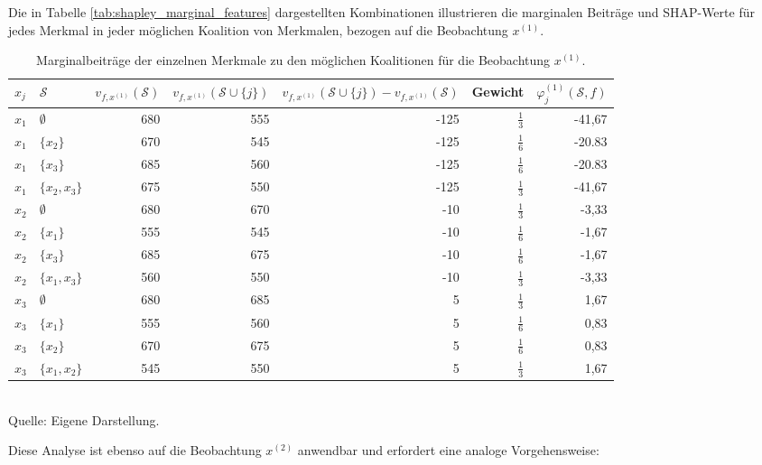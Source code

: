 Die in Tabelle \ref{tab:shapley_marginal_features} dargestellten Kombinationen illustrieren die marginalen Beiträge und SHAP-Werte 
für jedes Merkmal in jeder möglichen Koalition von Merkmalen, bezogen auf die Beobachtung $x^{(1)}$. 

\begin{table}[h]
    \caption{Marginalbeiträge der einzelnen Merkmale zu den möglichen Koalitionen für die Beobachtung $x^{(1)}$.}
    \footnotesize
    \begin{tabularx}{\textwidth}{XXrrrrr}
    \toprule
    $x_{j}$ & $\mathcal{S}$ & $v_{f, x^{(1)}}(\mathcal{S})$ & $v_{f, x^{(1)}}(\mathcal{S} \cup \{j\})$ & $v_{f, x^{(1)}}(\mathcal{S} \cup \{j\}) - v_{f, x^{(1)}}(\mathcal{S})$ & Gewicht & $\varphi_{j}^{(1)}(\mathcal{S}, f)$\\
    \midrule
    $x_1$ & $\emptyset$ & 680 & 555 & -125 & $\frac{1}{3}$ & -41,67 \\
    $x_1$ & $\{x_2\}$ & 670 & 545 & -125 & $\frac{1}{6}$ & -20.83 \\
    $x_1$ & $\{x_3\}$ & 685 & 560 & -125 & $\frac{1}{6}$ & -20.83 \\
    $x_1$ & $\{x_2, x_3\}$ & 675 & 550 & -125 & $\frac{1}{3}$ & -41,67 \\
    $x_2$ & $\emptyset$ & 680 & 670 & -10 & $\frac{1}{3}$ & -3,33 \\
    $x_2$ & $\{x_1\}$ & 555 & 545 & -10 & $\frac{1}{6}$ & -1,67 \\
    $x_2$ & $\{x_3\}$ & 685 & 675 & -10 & $\frac{1}{6}$ & -1,67 \\
    $x_2$ & $\{x_1, x_3\}$ & 560 & 550 & -10 & $\frac{1}{3}$ & -3,33 \\
    $x_3$ & $\emptyset$ & 680 & 685 & 5 & $\frac{1}{3}$ & 1,67 \\
    $x_3$ & $\{x_1\}$ & 555 & 560 & 5 & $\frac{1}{6}$ & 0,83 \\
    $x_3$ & $\{x_2\}$ & 670 & 675 & 5 & $\frac{1}{6}$ & 0,83 \\
    $x_3$ & $\{x_1, x_2\}$ & 545 & 550 & 5 & $\frac{1}{3}$ & 1,67 \\
    \bottomrule
    \end{tabularx}
    \label{tab:shapley_marginal_features_x1}
    \normalsize\\
    Quelle: Eigene Darstellung.
\end{table}

Diese Analyse ist ebenso auf die Beobachtung $x^{(2)}$ anwendbar und erfordert eine analoge Vorgehensweise:

